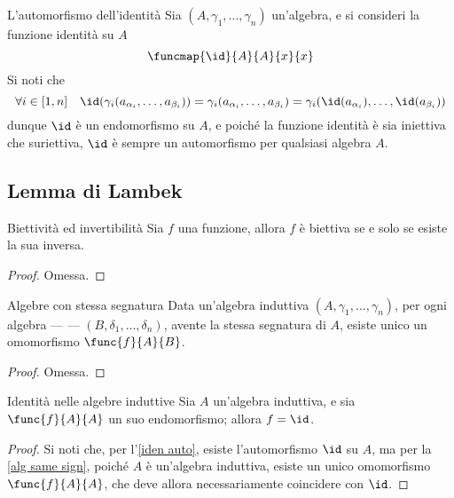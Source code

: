 \documentclass[a4paper, 12pt]{report}
\begin{document}
    \begin{framedobs}[label={iden auto}]{L'automorfismo dell'identità}
        Sia $(A, \gamma_1, \ldots, \gamma_n)$ un'algebra, e si consideri la funzione identità su $A$ $$\funcmap{\id}{A}{A}{x}{x}$$ Si noti che $$\forall i \in [1, n] \quad \id(\gamma_i(a_{\alpha_i}, \ldots, a_{\beta_i})) = \gamma_i(a_{\alpha_i}, \ldots, a_{\beta_i}) = \gamma_i(\id(a_{\alpha_i}), \ldots, \id(a_{\beta_i}))$$ dunque $\id$ è un endomorfismo su $A$, e poiché la funzione identità è sia iniettiva che suriettiva, $\id$ è sempre un automorfismo per qualsiasi algebra $A$.
    \end{framedobs}

    \subsection{Lemma di Lambek}

    \begin{framedprop}[label={bij}]{Biettività ed invertibilità}
        Sia $f$ una funzione, allora $f$ è biettiva se e solo se esiste la sua inversa.
    \end{framedprop}

    \begin{proof}
        Omessa.
    \end{proof}

    \begin{framedprop}[label={alg same sign}]{Algebre con stessa segnatura}
        Data un'algebra induttiva $(A, \gamma_1, \ldots, \gamma_n)$, per ogni algebra ---  --- $(B, \delta_1, \ldots, \delta_n)$, avente la stessa segnatura di $A$, esiste unico un omomorfismo $\func{f}{A}{B}$.
    \end{framedprop}

    \begin{proof}
        Omessa.
    \end{proof}

    \begin{framedcor}[label={iden inductive alg}]{Identità nelle algebre induttive}
        Sia $A$ un'algebra induttiva, e sia $\func{f}{A}{A}$ un suo endomorfismo; allora $f = \id$.
    \end{framedcor}

    \begin{proof}
        Si noti che, per l'\cref{iden auto}, esiste l'automorfismo $\id$ su $A$, ma per la \cref{alg same sign}, poiché $A$ è un'algebra induttiva, esiste un unico omomorfismo $\func{f}{A}{A}$, che deve allora necessariamente coincidere con $\id$.
    \end{proof}
\end{document}
